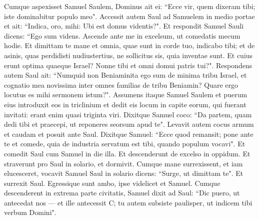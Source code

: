 \begin{biblechapter}
\verse Cumque aspexisset Samuel Saulem, Dominus ait ei: “Ecce vir, quem dixeram tibi; iste dominabitur populo meo". 
\verse Accessit autem Saul ad Samuelem in medio portae et ait: “Indica, oro, mihi: Ubi est domus videntis?". 
\verse Et respondit Samuel Sauli dicens: “Ego sum videns. Ascende ante me in excelsum, ut comedatis mecum hodie. Et dimittam te mane et omnia, quae sunt in corde tuo, indicabo tibi; 
\verse et de asinis, quas perdidisti nudiustertius, ne sollicitus sis, quia inventae sunt. Et cuius erunt optima quaeque Israel? Nonne tibi et omni domui patris tui?". 
\verse Respondens autem Saul ait: “Numquid non Beniaminita ego sum de minima tribu Israel, et cognatio mea novissima inter omnes familias de tribu Beniamin? Quare ergo locutus es mihi sermonem istum?". 
\verse Assumens itaque Samuel Saulem et puerum eius introduxit eos in triclinium et dedit eis locum in capite eorum, qui fuerant invitati: erant enim quasi triginta viri. 
\verse Dixitque Samuel coco: “Da partem, quam dedi tibi et praecepi, ut reponeres seorsum apud te". 
\verse Levavit autem cocus armum et caudam et posuit ante Saul. Dixitque Samuel: “Ecce quod remansit; pone ante te et comede, quia de industria servatum est tibi, quando populum vocavi". Et comedit Saul cum Samuel in die illa. 
\verse Et descenderunt de excelso in oppidum. Et straverunt pro Saul in solario, et dormivit. 
\verse Cumque mane surrexissent, et iam elucesceret, vocavit Samuel Saul in solario dicens: “Surge, ut dimittam te". Et surrexit Saul. Egressique sunt ambo, ipse videlicet et Samuel. 
\verse Cumque descenderent in extrema parte civitatis, Samuel dixit ad Saul: “Dic puero, ut antecedat nos — et ille antecessit C; tu autem subsiste paulisper, ut indicem tibi verbum Domini". 
\end{biblechapter}

